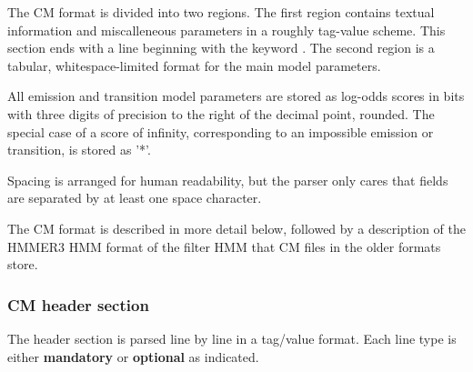 The CM format is divided into two regions. The first region contains
textual information and miscalleneous parameters in a roughly
tag-value scheme. This section ends with a line beginning with the
keyword . The second region is a tabular, whitespace-limited
format for the main model parameters.

All emission and transition model parameters are stored as log-odds
scores in bits with three digits of precision to the right of the
decimal point, rounded. 
The special case of a score of infinity, corresponding to an
impossible emission or transition, is stored as '*'.

Spacing is arranged for human readability, but the parser only cares
that fields are separated by at least one space character.

The CM format is described in more detail below, followed by a
description of the HMMER3 HMM format of the filter HMM that CM files
in the older formats store.

\subsubsection{CM header section}

The header section is parsed line by line in a tag/value format. Each
line type is either \textbf{mandatory} or \textbf{optional} as
indicated. 

